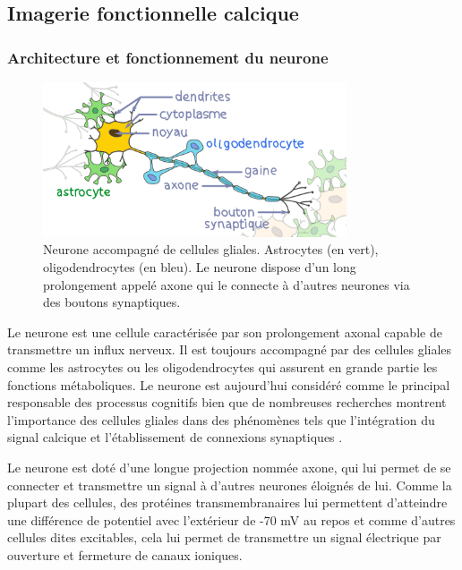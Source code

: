 \subsection{Imagerie fonctionnelle calcique}

\subsubsection{Architecture et fonctionnement du neurone}

\begin{figure}[b]
  \centering
  \includegraphics[width=0.8\textwidth]{./files/neurone.svg.png}
  \caption{Neurone accompagné de cellules gliales. Astrocytes (en vert), oligodendrocytes (en bleu). Le neurone dispose d'un long prolongement appelé axone qui le connecte à d'autres neurones via des boutons synaptiques.}
  \end{figure}

Le neurone est une cellule caractérisée par son prolongement axonal capable de transmettre un influx nerveux. Il est toujours accompagné par des cellules gliales comme les astrocytes ou les oligodendrocytes qui assurent en grande partie les fonctions métaboliques. Le neurone est aujourd'hui considéré comme le principal responsable des processus cognitifs bien que de nombreuses recherches montrent l'importance des cellules gliales dans des phénomènes tels que l'intégration du signal calcique et l'établissement de connexions synaptiques \cite{verkhratsky_calcium_1996} \cite{pfrieger_synaptic_1997}.

Le neurone est doté d'une longue projection nommée axone, qui lui permet de se connecter et transmettre un signal à d'autres neurones éloignés de lui. Comme la plupart des cellules, des protéines transmembranaires lui permettent d'atteindre une différence de potentiel avec l'extérieur de -70 mV au repos et comme d'autres cellules dites excitables, cela lui permet de transmettre un signal électrique par ouverture et fermeture de canaux ioniques.

